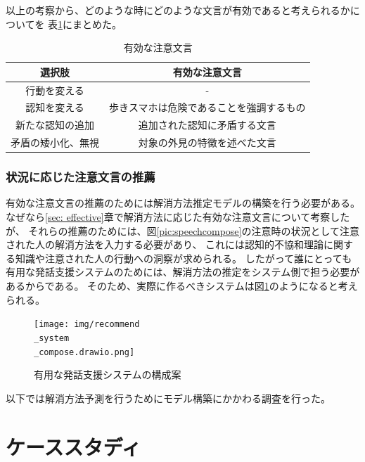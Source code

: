 \documentclass{kuisthesis}
\begin{document}
\vspace{5mm}
以上の考察から、どのような時にどのような文言が有効であると考えられるかについてを
表\ref{fig: EffectiveWords}にまとめた。
\begin{table}[H]
  \centering
  \caption{有効な注意文言}
  \label{fig: EffectiveWords}
  \begin{tabular}{c|c|c|c}
      \multicolumn{2}{c|}{選択肢} & \multicolumn{2}{c}{有効な注意文言} \\ \hline
      \multicolumn{2}{c|}{行動を変える} & \multicolumn{2}{c}{-} \\ \hline
      \multicolumn{2}{c|}{認知を変える} & \multicolumn{2}{c}{歩きスマホは危険であることを強調するもの} \\ \hline
      \multicolumn{2}{c|}{新たな認知の追加} & \multicolumn{2}{c}{追加された認知に矛盾する文言} \\ \hline
      \multicolumn{2}{c|}{矛盾の矮小化、無視} & \multicolumn{2}{c}{対象の外見の特徴を述べた文言} \\
  \end{tabular}
\end{table}

\subsubsection{状況に応じた注意文言の推薦}

有効な注意文言の推薦のためには解消方法推定モデルの構築を行う必要がある。
なぜなら\ref{sec: effective}章で解消方法に応じた有効な注意文言について考察したが、
それらの推薦のためには、図\ref{pic:speechcompose}の注意時の状況として注意された人の解消方法を入力する必要があり、
これには認知的不協和理論に関する知識や注意された人の行動への洞察が求められる。
したがって誰にとっても有用な発話支援システムのためには、解消方法の推定をシステム側で担う必要があるからである。
そのため、実際に作るべきシステムは図\ref{pic:recommendcompose}のようになると考えられる。
\label{sec: recommend}
\begin{figure}[htb]
  \centering
  \texttt{[image: img/recommend\\\_system\\\_compose.drawio.png]}
  \caption{有用な発話支援システムの構成案}
  \label{pic:recommendcompose}
\end{figure}
以下では解消方法予測を行うためにモデル構築にかかわる調査を行った。


\section{ケーススタディ}
\end{document}
